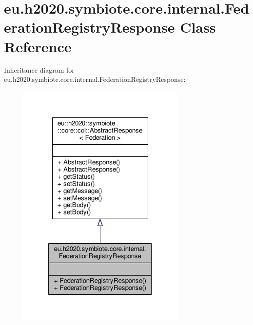 \hypertarget{classeu_1_1h2020_1_1symbiote_1_1core_1_1internal_1_1FederationRegistryResponse}{}\section{eu.\+h2020.\+symbiote.\+core.\+internal.\+Federation\+Registry\+Response Class Reference}
\label{classeu_1_1h2020_1_1symbiote_1_1core_1_1internal_1_1FederationRegistryResponse}


Inheritance diagram for eu.\+h2020.\+symbiote.\+core.\+internal.\+Federation\+Registry\+Response\+:\nopagebreak
\begin{figure}[H]
\begin{center}
\leavevmode
\includegraphics[width=236pt]{classeu_1_1h2020_1_1symbiote_1_1core_1_1internal_1_1FederationRegistryResponse__inherit__graph}
\end{center}
\end{figure}


